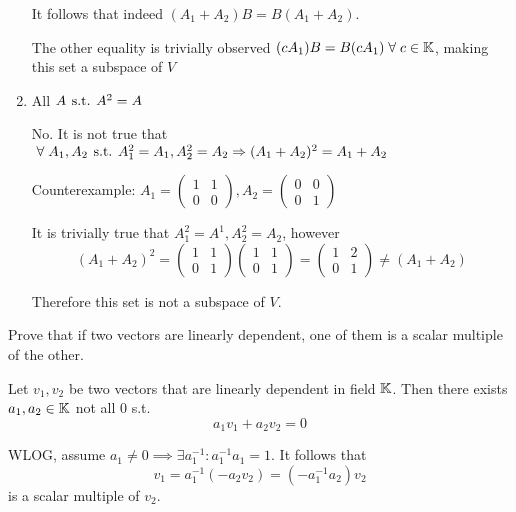 \documentclass[a4paper, 10pt]{article}
\begin{document}
\begin{solution}
\begin{enumerate}
              It follows that indeed \((A_1 + A_2) B = B(A_1 + A_2)\).

              The other equality is trivially observed \((c A_1) B = B (c A_1) \forall c \in \bbk\), making this set a subspace of \(V\)


        \item All \(A \hspace*{4pt}\text{s.t.}\hspace*{4pt} A^2 = A\)

              No. It is not true that \(\forall A_1, A_2 \st A_1^2 = A_1, A_2^2 = A_2 \implies (A_1 + A_2)^2 = A_1 + A_2\)

              Counterexample: \(A_1 = \begin{pmatrix}
                      1 & 1 \\
                      0 & 0
                  \end{pmatrix}, A_2 = \begin{pmatrix}
                      0 & 0 \\
                      0 & 1
                  \end{pmatrix}\)

              It is trivially true that \(A_1^2 = A^1, A_2^2 = A_2\), however \[
                  (A_1 + A_2)^2 = \begin{pmatrix}
                          1 & 1 \\
                          0 & 1
                      \end{pmatrix}\begin{pmatrix}
                          1 & 1 \\
                          0 & 1
                      \end{pmatrix} = \begin{pmatrix}
                          1 & 2 \\
                          0 & 1
                      \end{pmatrix} \neq (A_1 + A_2)
              \]

              Therefore this set is not a subspace of \(V\).
    \end{enumerate}

\end{solution}

\begin{problem} 
Prove that if two vectors are linearly dependent, one of them is a scalar multiple of the other.
\end{problem}
\begin{solution}
    Let \(v_1, v_2\) be two vectors that are linearly dependent in field \(\mathbb{K}\). Then there exists \(a_1, a_2 \in \mathbb{K}\) not all 0 s.t.
    \begin{equation*}
        a_1v_1 + a_2v_2 = 0
    \end{equation*}

    WLOG, assume \(a_1 \neq 0 \implies \exists a_1^{-1}: a_1^{-1}a_1 = 1\). It follows that \[
        v_1 = a_1^{-1}(-a_2v_2) = (-a_1^{-1}a_2)v_2
    \]
    is a scalar multiple of \(v_2\).
\end{solution}
\end{document}
